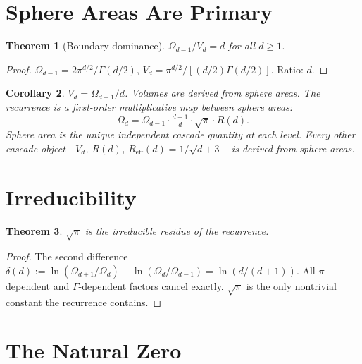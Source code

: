 \documentclass[11pt,a4paper]{article}
\newtheorem{theorem}{Theorem}[section]
\newtheorem{corollary}[theorem]{Corollary}
\begin{document}
\section{Sphere Areas Are Primary}

\begin{theorem}[Boundary dominance]\label{thm:boundary}
$\Omega_{d-1}/V_d = d$ for all $d\geq 1$.
\end{theorem}

\begin{proof}
$\Omega_{d-1} = 2\pi^{d/2}/\Gamma(d/2)$,\;
$V_d = \pi^{d/2}/[(d/2)\Gamma(d/2)]$.\; Ratio: $d$.
\end{proof}

\begin{corollary}\label{cor:primary}
$V_d = \Omega_{d-1}/d$. Volumes are derived from sphere areas. The
recurrence is a first-order multiplicative map between sphere areas:
\[
\Omega_d = \Omega_{d-1}\cdot\tfrac{d+1}{d}\cdot\sqrt{\pi}\cdot R(d).
\]
Sphere area is the unique independent cascade quantity at each level.
Every other cascade object---$V_d$, $R(d)$,
$R_{\mathrm{eff}}(d) = 1/\sqrt{d+3}$---is derived from sphere areas.
\end{corollary}

\section{Irreducibility}

\begin{theorem}\label{thm:irred}
$\sqrt{\pi}$ is the irreducible residue of the recurrence.
\end{theorem}

\begin{proof}
The second difference
$\delta(d) := \ln(\Omega_{d+1}/\Omega_d) - \ln(\Omega_d/\Omega_{d-1})
= \ln(d/(d+1))$. All $\pi$-dependent and $\Gamma$-dependent factors
cancel exactly. $\sqrt{\pi}$ is the only nontrivial constant the
recurrence contains.
\end{proof}

\section{The Natural Zero}
\end{document}
